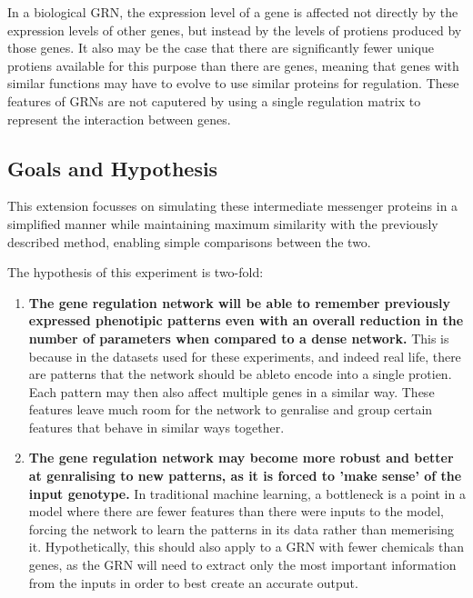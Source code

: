 \documentclass[twocolumn,a4paper,12pt]{article}
\begin{document}
    In a biological GRN, the expression level of a gene is affected not directly by the expression levels of other genes, but instead by the levels of protiens produced by those genes. It also may be the case that there are significantly fewer unique protiens available for this purpose than there are genes, meaning that genes with similar functions may have to evolve to use similar proteins for regulation. These features of GRNs are not caputered by using a single regulation matrix to represent the interaction between genes.

    \subsection{Goals and Hypothesis}
    This extension focusses on simulating these intermediate messenger proteins in a simplified manner while maintaining maximum similarity with the previously described method, enabling simple comparisons between the two.

    The hypothesis of this experiment is two-fold:
    \begin{enumerate}
        \item \textbf{The gene regulation network will be able to remember previously expressed phenotipic patterns even with an overall reduction in the number of parameters when compared to a dense network.} This is because in the datasets used for these experiments, and indeed real life, there are patterns that the network should be ableto encode into a single protien. Each pattern may then also affect multiple genes in a similar way. These features leave much room for the network to genralise and group certain features that behave in similar ways together.
        \item \textbf{The gene regulation network may become more robust and better at genralising to new patterns, as it is forced to 'make sense' of the input genotype.} In traditional machine learning, a bottleneck is a point in a model where there are fewer features than there were inputs to the model, forcing the network to learn the patterns in its data rather than memerising it. Hypothetically, this should also apply to a GRN with fewer chemicals than genes, as the GRN will need to extract only the most important information from the inputs in order to best create an accurate output.
    \end{enumerate}
\end{document}
